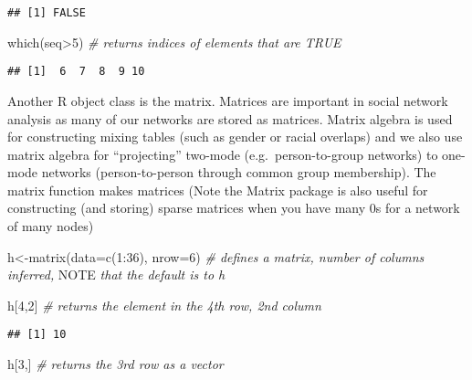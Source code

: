 \documentclass[
]{article}
\newenvironment{Shaded}{\begin{snugshade}}{\end{snugshade}}
\newcommand{\AlertTok}[1]{\textcolor[rgb]{0.94,0.16,0.16}{#1}}
\newcommand{\AttributeTok}[1]{\textcolor[rgb]{0.77,0.63,0.00}{#1}}
\newcommand{\CommentTok}[1]{\textcolor[rgb]{0.56,0.35,0.01}{\textit{#1}}}
\newcommand{\DecValTok}[1]{\textcolor[rgb]{0.00,0.00,0.81}{#1}}
\newcommand{\FunctionTok}[1]{\textcolor[rgb]{0.00,0.00,0.00}{#1}}
\newcommand{\NormalTok}[1]{#1}
\newcommand{\OtherTok}[1]{\textcolor[rgb]{0.56,0.35,0.01}{#1}}
\newcommand{\SpecialCharTok}[1]{\textcolor[rgb]{0.00,0.00,0.00}{#1}}
\begin{document}
\begin{verbatim}
## [1] FALSE
\end{verbatim}

\begin{Shaded}
\begin{Highlighting}[]
\FunctionTok{which}\NormalTok{(seq}\SpecialCharTok{\textgreater{}}\DecValTok{5}\NormalTok{)                }\CommentTok{\# returns indices of elements that are TRUE}
\end{Highlighting}
\end{Shaded}

\begin{verbatim}
## [1]  6  7  8  9 10
\end{verbatim}

Another R object class is the matrix. Matrices are important in social
network analysis as many of our networks are stored as matrices. Matrix
algebra is used for constructing mixing tables (such as gender or racial
overlaps) and we also use matrix algebra for ``projecting'' two-mode
(e.g.~person-to-group networks) to one-mode networks (person-to-person
through common group membership). The matrix function makes matrices
(Note the Matrix package is also useful for constructing (and storing)
sparse matrices when you have many 0s for a network of many nodes)

\begin{Shaded}
\begin{Highlighting}[]
\NormalTok{h}\OtherTok{\textless{}{-}}\FunctionTok{matrix}\NormalTok{(}\AttributeTok{data=}\FunctionTok{c}\NormalTok{(}\DecValTok{1}\SpecialCharTok{:}\DecValTok{36}\NormalTok{), }\AttributeTok{nrow=}\DecValTok{6}\NormalTok{) }\CommentTok{\# defines a matrix, number of columns inferred, }\AlertTok{NOTE}\CommentTok{ that the default is to h               }

\NormalTok{h[}\DecValTok{4}\NormalTok{,}\DecValTok{2}\NormalTok{]                  }\CommentTok{\# returns the element in the 4th row, 2nd column}
\end{Highlighting}
\end{Shaded}

\begin{verbatim}
## [1] 10
\end{verbatim}

\begin{Shaded}
\begin{Highlighting}[]
\NormalTok{h[}\DecValTok{3}\NormalTok{,]                       }\CommentTok{\# returns the 3rd row as a vector}
\end{Highlighting}
\end{Shaded}
\end{document}
